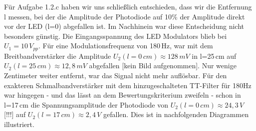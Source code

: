\documentclass{scrartcl}						%
\begin{document}
			Für Aufgabe 1.2.c haben wir uns schließlich entschieden, dass wir die Entfernung l messen, bei der die Amplitude der Photodiode auf 10\% der Amplitude direkt vor der LED (l=0) abgefallen ist. Im Nachhinein war diese Entscheidung nicht besonders günstig. Die Eingangsspannung des LED Modulators blieb bei $ U_1=10\,V_{pp} $. Für eine Modulationsfrequenz von 180\,Hz, war mit dem Breitbandverstärker die Amplitude $ U_2(l=0\,cm)\approx128\,mV $ in l=25\,cm auf $ U_2(l=25\,cm)\approx12,8\,mV $ abgefallen [kein Bild aufgenommen]. Nur wenige Zentimeter weiter entfernt, war das Signal nicht mehr auflösbar. Für den exakteren Schmalbandverstärker mit dem hinzugeschalteten TT-Filter für 180Hz war hingegen - und das lässt an dem Bewertungskriterium zweifeln - schon in l=17\,cm die Spannungsamplitude der Photodiode von $ U_2(l=0\,cm)\approx24,3\,V $ [!!!] auf $ U_2(l=17\,cm)\approx2,4\,V $ gefallen. Dies ist in nachfolgenden Diagrammen illustriert.\\
\end{document}
